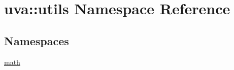 \hypertarget{namespaceuva_1_1utils}{}\section{uva\+:\+:utils Namespace Reference}
\label{namespaceuva_1_1utils}
\subsection*{Namespaces}
\begin{DoxyCompactItemize}
\item 
 \hyperlink{namespaceuva_1_1utils_1_1math}{math}
\end{DoxyCompactItemize}
